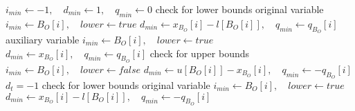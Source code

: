 \documentclass[a4paper]{article}
\begin{document}
\begin{algorithmic}
\State $i_{min} \gets -1, \quad     d_{min} \gets 1, \quad  q_{min} \gets 0$
            \Comment check for lower bounds
                \Comment original variable
                        \State $i_{min} \gets B_{O}[i], \quad lower \gets true$
                        \State $d_{min} \gets x_{B_{O}}[i]-l[B_{O}[i]],
                            \quad q_{min} \gets q_{B_{O}}[i]$
                    \EndIf
                \EndIf
            \Else
                \Comment auxiliary variable
                    \State $i_{min} \gets B_{O}[i], \quad lower \gets true$
                    \State $d_{min} \gets x_{B_{O}}[i],
                        \quad q_{min} \gets q_{B_{O}}[i]$
                \EndIf
            \EndIf
            \Comment check for upper bounds
                    \State $i_{min} \gets B_{O}[i], \quad lower \gets false$
                    \State $d_{min} \gets u[B_{O}[i]]-x_{B_{O}}[i],
                        \quad q_{min} \gets -q_{B_{O}}[i]$
                \EndIf
            \EndIf
        \EndIf
    \EndFor
\Else
    \Comment $d_{t}=-1$
            \Comment check for lower bounds
                \Comment original variable
                        \State $i_{min} \gets B_{O}[i], \quad lower \gets true$
                        \State $d_{min} \gets x_{B_{O}}[i]-l[B_{O}[i]],
                            \quad q_{min} \gets -q_{B_{O}}[i]$

\end{algorithmic}
\end{document}
